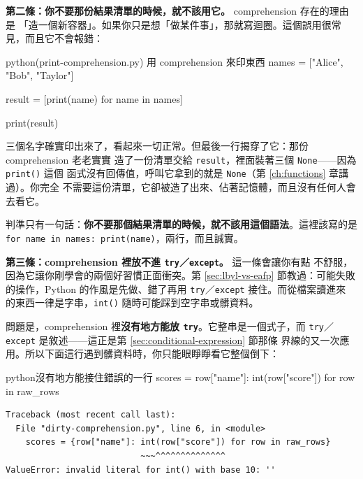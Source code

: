 \textbf{第二條：你不要那份結果清單的時候，就不該用它。} comprehension 存在的理由是
「造一個新容器」。如果你只是想「做某件事」，那就寫迴圈。這個誤用很常見，而且它不會報錯：

\begin{example}{python}{(print-comprehension.py) 用 comprehension 來印東西}
names = ["Alice", "Bob", "Taylor"]

result = [print(name) for name in names]

print(result)
\end{example}


三個名字確實印出來了，看起來一切正常。但最後一行揭穿了它：那份 comprehension 老老實實
造了一份清單交給 \texttt{result}，裡面裝著三個 \texttt{None}——因為 \texttt{print()} 這個
函式沒有回傳值，呼叫它拿到的就是 \texttt{None}（第 \ref{ch:functions} 章講過）。你完全
不需要這份清單，它卻被造了出來、佔著記憶體，而且沒有任何人會去看它。

判準只有一句話：\textbf{你不要那個結果清單的時候，就不該用這個語法}。這裡該寫的是
\texttt{for name in names: print(name)}，兩行，而且誠實。

\textbf{第三條：comprehension 裡放不進 \texttt{try}／\texttt{except}。} 這一條會讓你有點
不舒服，因為它讓你剛學會的兩個好習慣正面衝突。第 \ref{sec:lbyl-vs-eafp} 節教過：可能失敗
的操作，Python 的作風是先做、錯了再用 \texttt{try}／\texttt{except} 接住。而從檔案讀進來
的東西一律是字串，\texttt{int()} 隨時可能踩到空字串或髒資料。

問題是，comprehension 裡\textbf{沒有地方能放 \texttt{try}}。它整串是一個式子，而
\texttt{try}／\texttt{except} 是敘述——這正是第 \ref{sec:conditional-expression} 節那條
界線的又一次應用。所以下面這行遇到髒資料時，你只能眼睜睜看它整個倒下：

\begin{code}{python}{沒有地方能接住錯誤的一行}
scores = {row["name"]: int(row["score"]) for row in raw_rows}
\end{code}

\begin{verbatim}
Traceback (most recent call last):
  File "dirty-comprehension.py", line 6, in <module>
    scores = {row["name"]: int(row["score"]) for row in raw_rows}
                           ~~~^^^^^^^^^^^^^^
ValueError: invalid literal for int() with base 10: ''
\end{verbatim}

